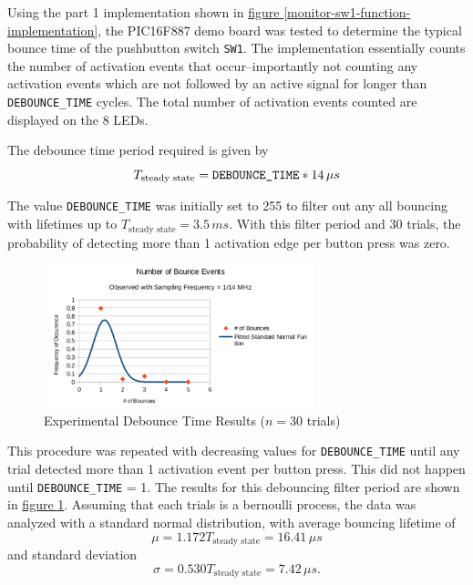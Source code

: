 \documentclass[11pt]{article}
\begin{document}
Using the part 1 implementation shown in
\hyperref[monitor-sw1-function-implementation]{figure \ref{monitor-sw1-function-implementation}},
the PIC16F887 demo board was tested to determine the typical bounce time of
the pushbutton switch \texttt{SW1}. The implementation essentially counts the
number of activation events that occur--importantly not counting any activation events
which are not followed by an active signal for longer than \texttt{DEBOUNCE\_TIME} cycles.
The total number of activation events counted are displayed on the 8 LEDs.

The debounce time period required is given by
\begin{equation*}
T_{\textrm{steady state}}=\textrm{\texttt{DEBOUNCE\_TIME}}*14\,\mu s
\end{equation*}

The value \texttt{DEBOUNCE\_TIME} was initially set to 255 to filter out any
all bouncing with lifetimes up to $T_{\textrm{steady state}}=3.5\,ms$.
With this filter period and 30 trials, the probability of
detecting more than 1 activation edge per button press was zero.

\begin{figure}
	\centering
	\includegraphics[width=0.7\textwidth]{Figures/debounce-time-results.pdf}
	\caption{Experimental Debounce Time Results ($n=30$ trials)}
	\label{debounce-time-results}
\end{figure}

This procedure was repeated with decreasing values for \texttt{DEBOUNCE\_TIME}
until any trial detected more than 1 activation event per button press.
This did not happen until \texttt{DEBOUNCE\_TIME} = 1.
The results for this debouncing filter period
are shown in \hyperref[debounce-time-results]{figure \ref{debounce-time-results}}.
Assuming that each trials is a bernoulli process, the data was
analyzed with a standard normal distribution, with average bouncing lifetime of
\begin{equation*}
\mu=1.172T_{\textrm{steady state}}=16.41\,\mu s
\end{equation*}
and standard deviation
\begin{equation*}
\sigma=0.530T_{\textrm{steady state}}=7.42\,\mu s.
\end{equation*}
\end{document}
